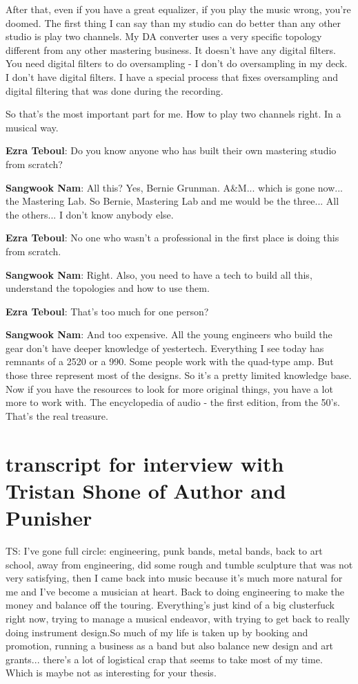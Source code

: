 After that, even if you have a great equalizer, if you play the music wrong, you're doomed. The first thing I can say than my studio can do better than any other studio is play two channels. My DA converter uses a very specific topology different from any other mastering business. It doesn't have any digital filters. You need digital filters to do oversampling - I don't do oversampling in my deck. I don't have digital filters. I have a special process that fixes oversampling and digital filtering that was done during the recording.

So that's the most important part for me. How to play two channels right. In a musical way.

\textbf{Ezra Teboul}: Do you know anyone who has built their own mastering studio from scratch?

\textbf{Sangwook Nam}: All this? Yes, Bernie Grunman. A\&M... which is gone now... the Mastering Lab. So Bernie, Mastering Lab and me would be the three... All the others... I don't know anybody else.

\textbf{Ezra Teboul}: No one who wasn't a professional in the first place is doing this from scratch.

\textbf{Sangwook Nam}: Right. Also, you need to have a tech to build all this, understand the topologies and how to use them.

\textbf{Ezra Teboul}: That's too much for one person?

\textbf{Sangwook Nam}: And too expensive. All the young engineers who build the gear don't have deeper knowledge of yestertech. Everything I see today has remnants of a 2520 or a 990. Some people work with the quad-type amp. But those three represent most of the designs. So it's a pretty limited knowledge base. Now if you have the resources to look for more original things, you have a lot more to work with. The encyclopedia of audio - the first edition, from the 50's. That's the real treasure.

\section{transcript for interview with Tristan Shone of Author and Punisher}

TS: I've gone full circle: engineering, punk bands, metal bands, back to art school, away from engineering, did some rough and tumble sculpture that was not very satisfying, then I came back into music because it's much more natural for me and I've become a musician at heart. Back to doing engineering to make the money and balance off the touring. Everything's just kind of a big clusterfuck right now, trying to manage a musical endeavor, with trying to get back to really doing instrument design.So much of my life is taken up by booking and promotion, running a business as a band but also balance new design and art grants... there's a lot of logistical crap that seems to take most of my time. Which is maybe not as interesting for your thesis. 

